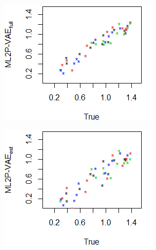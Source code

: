 \begin{figure}[h]
\centering
{}\\
    \begin{subfigure}{.32\textwidth}
      \centering
      \includegraphics[width=.9\linewidth]{img/ml_journal_results/4skills/vae_full_disc_4skills_cropped.png}
    \end{subfigure}
    \begin{subfigure}{.32\textwidth}
      \centering
      \includegraphics[width=.9\linewidth]{img/ml_journal_results/4skills/vae_est_disc_4skills_cropped.png}
    \end{subfigure}
    \begin{subfigure}{.32\textwidth}
      \centering

\end{subfigure}
\end{figure}
